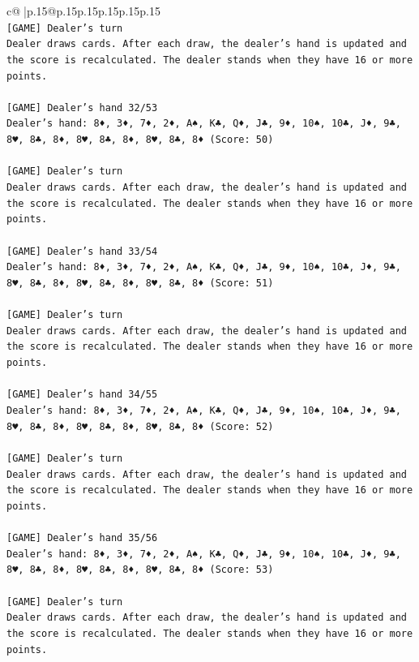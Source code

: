 \documentclass{article}
\begin{document}
{\begin{supertabular}{c@{$\;$}|p{.15\linewidth}@{}p{.15\linewidth}p{.15\linewidth}p{.15\linewidth}p{.15\linewidth}p{.15\linewidth}}
{{{\\ 
\texttt{{[}GAME{]} Dealer's turn} \\
\texttt{Dealer draws cards. After each draw, the dealer's hand is updated and the score is recalculated. The dealer stands when they have 16 or more points.} \\
\\ 
\texttt{{[}GAME{]} Dealer's hand 32/53} \\
\texttt{Dealer's hand: 8♦, 3♦, 7♦, 2♦, A♠, K♣, Q♦, J♣, 9♦, 10♠, 10♣, J♦, 9♣, 8♥, 8♣, 8♦, 8♥, 8♣, 8♦, 8♥, 8♣, 8♦ (Score: 50)} \\
\\ 
\texttt{{[}GAME{]} Dealer's turn} \\
\texttt{Dealer draws cards. After each draw, the dealer's hand is updated and the score is recalculated. The dealer stands when they have 16 or more points.} \\
\\ 
\texttt{{[}GAME{]} Dealer's hand 33/54} \\
\texttt{Dealer's hand: 8♦, 3♦, 7♦, 2♦, A♠, K♣, Q♦, J♣, 9♦, 10♠, 10♣, J♦, 9♣, 8♥, 8♣, 8♦, 8♥, 8♣, 8♦, 8♥, 8♣, 8♦ (Score: 51)} \\
\\ 
\texttt{{[}GAME{]} Dealer's turn} \\
\texttt{Dealer draws cards. After each draw, the dealer's hand is updated and the score is recalculated. The dealer stands when they have 16 or more points.} \\
\\ 
\texttt{{[}GAME{]} Dealer's hand 34/55} \\
\texttt{Dealer's hand: 8♦, 3♦, 7♦, 2♦, A♠, K♣, Q♦, J♣, 9♦, 10♠, 10♣, J♦, 9♣, 8♥, 8♣, 8♦, 8♥, 8♣, 8♦, 8♥, 8♣, 8♦ (Score: 52)} \\
\\ 
\texttt{{[}GAME{]} Dealer's turn} \\
\texttt{Dealer draws cards. After each draw, the dealer's hand is updated and the score is recalculated. The dealer stands when they have 16 or more points.} \\
\\ 
\texttt{{[}GAME{]} Dealer's hand 35/56} \\
\texttt{Dealer's hand: 8♦, 3♦, 7♦, 2♦, A♠, K♣, Q♦, J♣, 9♦, 10♠, 10♣, J♦, 9♣, 8♥, 8♣, 8♦, 8♥, 8♣, 8♦, 8♥, 8♣, 8♦ (Score: 53)} \\
\\ 
\texttt{{[}GAME{]} Dealer's turn} \\
\texttt{Dealer draws cards. After each draw, the dealer's hand is updated and the score is recalculated. The dealer stands when they have 16 or more points.} \\
}}}
\end{supertabular}}
\end{document}
